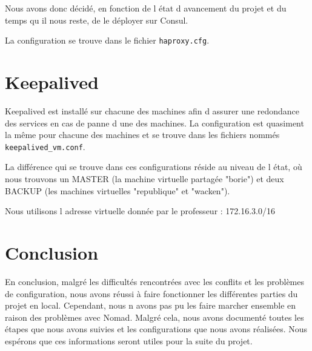 \documentclass{report}
\begin{document}
Nous avons donc décidé, en fonction de l état d avancement du projet et du temps qu il nous reste, de le déployer sur Consul.

La configuration se trouve dans le fichier \texttt{haproxy.cfg}.

\newpage

\chapter{Keepalived}
Keepalived est installé sur chacune des machines afin d assurer une redondance des services en cas de panne d une des machines. La configuration est quasiment la même pour chacune des machines et se trouve dans les fichiers nommés \texttt{keepalived\_vm.conf}.

La différence qui se trouve dans ces configurations réside au niveau de l état, où nous trouvons un MASTER (la machine virtuelle partagée "borie") et deux BACKUP (les machines virtuelles "republique" et "wacken").

Nous utilisons l adresse virtuelle donnée par le professeur : 172.16.3.0/16

\newpage

\chapter{Conclusion}
En conclusion, malgré les difficultés rencontrées avec les conflits et les problèmes de configuration, nous avons réussi à faire fonctionner les différentes parties du projet en local. Cependant, nous n avons pas pu les faire marcher ensemble en raison des problèmes avec Nomad. Malgré cela, nous avons documenté toutes les étapes que nous avons suivies et les configurations que nous avons réalisées. Nous espérons que ces informations seront utiles pour la suite du projet.
\end{document}
